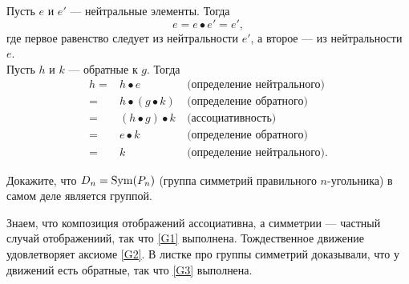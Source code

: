 \documentclass[a4paper,12pt]{article}
\begin{document}
    \begin{solution}
        \sub Пусть $e$ и $e'$ --- нейтральные элементы. Тогда
        \begin{equation*}
            e = e \bullet e' = e',
        \end{equation*}
        где первое равенство следует из нейтральности $e'$, а второе --- из нейтральности $e$. \\
        \sub Пусть $h$ и $k$ --- обратные к $g$. Тогда
        \begin{eqnarray*}
            h  =& h \bullet e \ &\text{(определение нейтрального)} \\
            =& h \bullet (g \bullet k) \ &\text{(определение обратного)} \\
            =& (h \bullet g) \bullet k \ &\text{(ассоциативность)} \\
            =& e \bullet k \ &\text{(определение обратного)} \\
            =& k \ &\text{(определение нейтрального)}.
        \end{eqnarray*}
    \end{solution}
    \problem Докажите, что $D_n = \operatorname{Sym}(P_n)$ (группа симметрий правильного $n$-угольника) в самом деле является группой.
    \begin{solution}
        Знаем, что композиция отображений ассоциативна, а симметрии --- частный случай отображениий, так что \ref{G1} выполнена. Тождественное движение удовлетворяет аксиоме \ref{G2}. В листке про группы симметрий доказывали, что у движений есть обратные, так что \ref{G3} выполнена.
    \end{solution}
    
\end{document}
